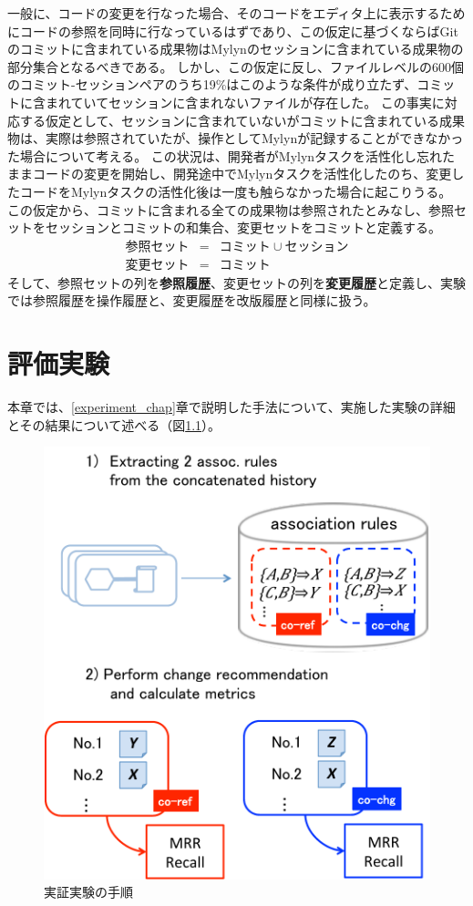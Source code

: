 \documentclass[a4paper]{jsbook}
\begin{document}
一般に、コードの変更を行なった場合、そのコードをエディタ上に表示するためにコードの参照を同時に行なっているはずであり、この仮定に基づくならばGitのコミットに含まれている成果物はMylynのセッションに含まれている成果物の部分集合となるべきである。
しかし、この仮定に反し、ファイルレベルの600個のコミット-セッションペアのうち19\%はこのような条件が成り立たず、コミットに含まれていてセッションに含まれないファイルが存在した。
この事実に対応する仮定として、セッションに含まれていないがコミットに含まれている成果物は、実際は参照されていたが、操作としてMylynが記録することができなかった場合について考える。
この状況は、開発者がMylynタスクを活性化し忘れたままコードの変更を開始し、開発途中でMylynタスクを活性化したのち、変更したコードをMylynタスクの活性化後は一度も触らなかった場合に起こりうる。
この仮定から、コミットに含まれる全ての成果物は参照されたとみなし、参照セットをセッションとコミットの和集合、変更セットをコミットと定義する。
\begin{eqnarray}
  参照セット &=& コミット \cup セッション\\
  変更セット &=&  コミット
\end{eqnarray}
そして、参照セットの列を{\bf 参照履歴}、変更セットの列を{\bf 変更履歴}と定義し、実験では参照履歴を操作履歴と、変更履歴を改版履歴と同様に扱う。


\chapter{評価実験}\label{result_chap}
本章では、\ref{experiment_chap}章で説明した手法について、実施した実験の詳細とその結果について述べる（図\ref{procedure}）。

\begin{figure}[tb]
  \centering
  \includegraphics[width = 0.7\linewidth]{resource/procedure.pdf}
  \caption{実証実験の手順}
  \label{procedure}
\end{figure}
\end{document}
